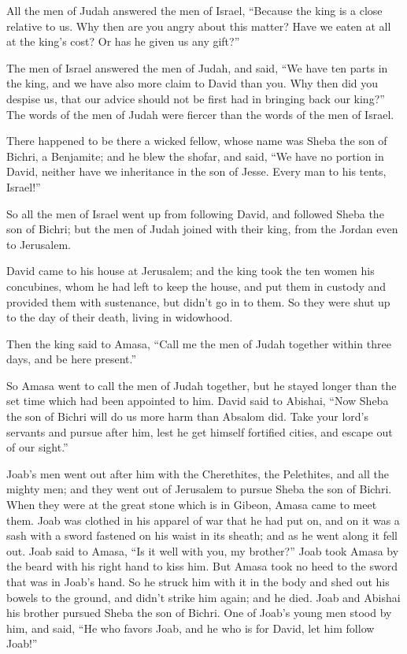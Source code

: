 \myverse{}All the men of Judah answered the men of Israel, “Because the
king is a close relative to us. Why then are you angry about this matter? Have we eaten at all at the
king’s cost? Or has he given us any gift?”

\myverse{}The men of Israel answered the men of Judah, and said, “We have
ten parts in the king, and we have also more claim to David than you. Why then did you despise us, that
our advice should not be first had in bringing back our king?” The words of the men of Judah were fiercer
than the words of the men of Israel.


\mychapter{} \myverse*{}There happened to be there a wicked fellow, whose name was Sheba
the son of Bichri, a Benjamite; and he blew the shofar, and said, “We have no portion in David, neither
have we inheritance in the son of Jesse. Every man to his tents, Israel!”

\myverse{}So all the men of Israel went up from following David, and followed
Sheba the son of Bichri; but the men of Judah joined with their king, from the Jordan even to Jerusalem.

\myverse{}David came to his house at Jerusalem; and the king took the ten
women his concubines, whom he had left to keep the house, and put them in custody and provided them with
sustenance, but didn’t go in to them. So they were shut up to the day of their death, living in widowhood.

\myverse{}Then the king said to Amasa, “Call me the men of Judah together
within three days, and be here present.”

\myverse{}So Amasa went to call the men of Judah together, but he stayed
longer than the set time which had been appointed to him.
\myverse{}David said to Abishai, “Now Sheba the son of Bichri will do us more harm than
Absalom did. Take your lord’s servants and pursue after him, lest he get himself fortified cities, and
escape out of our sight.”

\myverse{}Joab’s men went out after him with the Cherethites, the Pelethites,
and all the mighty men; and they went out of Jerusalem to pursue Sheba the son of Bichri.
\myverse{}When they were at the great stone which is in Gibeon, Amasa came to meet them.
Joab was clothed in his apparel of war that he had put on, and on it was a sash with a sword fastened
on his waist in its sheath; and as he went along it fell out.
\myverse{}Joab said to Amasa, “Is it well with you, my brother?” Joab took Amasa by the
beard with his right hand to kiss him.
\myverse{}But Amasa took no heed to the sword that was in Joab’s hand. So he struck
him with it in the body and shed out his bowels to the ground, and didn’t strike him again; and he died.
Joab and Abishai his brother pursued Sheba the son of Bichri.
\myverse{}One of Joab’s young men stood by him, and said, “He who favors Joab, and
he who is for David, let him follow Joab!”

